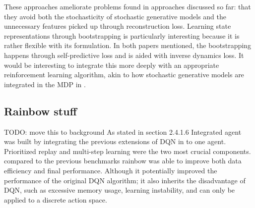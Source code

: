 These approaches ameliorate problems found in approaches discussed so far: that they avoid both the stochasticity 
of stochastic generative models and the unnecessary features picked up through reconstruction loss.
Learning state representations through bootstrapping is particularly interesting because it is rather
flexible with its formulation. In both papers mentioned, the bootstrapping happens
through self-predictive loss and is aided with inverse dynamics loss.
It would be interesting to integrate this more deeply with an appropriate reinforcement learning algorithm,
akin to how stochastic generative models are integrated in the MDP in \cite{slac}.


\subsection{Rainbow stuff}
TODO: move this to background
As stated in section 2.4.1.6 Integrated agent  
was built by integrating the previous extensions of DQN in to one agent.
Prioritized replay and multi-step learning were the two most crucial components.
compared to the previous benchmarks rainbow was able to improve both  
data efficiency and final performance.
Although it potentially improved the performance of the original
DQN algorithm; it also inherits the disadvantage of DQN, such as excessive
memory usage, learning instability, and can only be applied to a discrete
action space\cite{investigationontheDeepLearningFramework}.

 
